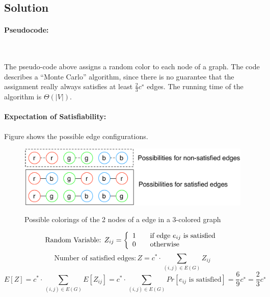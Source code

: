 \documentclass[a4paper, 12pt]{report}
\begin{document}
\subsection{Solution}

\paragraph{Pseudocode:}~
\begin{leftbar}
    
\end{leftbar}

The pseudo-code above assigns a random color to each node of a graph. The code
describes a “Monte Carlo” algorithm, since there is no guarantee that the
assignment really always satisfies at least $\frac{2}{3} c^∗$ edges. The
running time of the algorithm is $Θ(|V|)$.

\paragraph{Expectation of Satisfiability:}

Figure shows the possible edge configurations.

\begin{figure}[htbp]
    \caption{Possible colorings of the 2 nodes of a edge in a 3-colored graph}
    \vskip 0.2cm
    \centering
    \includegraphics[width=\textwidth]{Figures/3_Color_Possibilities_Edges}
    \label{figure:3_Color_Possibilities_Edges}
\end{figure}


\[
	\text{Random Variable: } Z_{ij} =
    \left\{
    	\begin{array}{l l}
    		1 & \quad \text{if edge $e_{ij}$ is satisfied}\\

    		0 & \quad \text{otherwise}
    	\end{array}
    \right.
\]
\[
    \text{Number of satisfied edges}: Z = c^* · ∑_{(i,j)∈E(G)} Z_{ij}
\]
\[
    E[Z] =
    c^* · ∑_{(i,j)∈E(G)}E[Z_{ij}] =
    c^* · ∑_{(i,j)∈E(G)}Pr[e_{ij} \text{ is satisfied}] =
    \frac{6}{9} c^∗=
    \frac{2}{3} c^∗
\]
\end{document}
